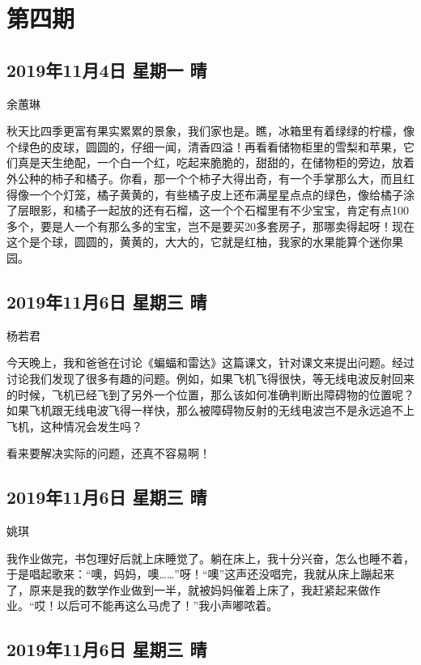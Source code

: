 \chapter{第四期}

\section{2019年11月4日 星期一 晴}

余蕙琳

秋天比四季更富有果实累累的景象，我们家也是。瞧，冰箱里有着绿绿的柠檬，像个绿色的皮球，圆圆的，仔细一闻，清香四溢！再看看储物柜里的雪梨和苹果，它们真是天生绝配，一个白一个红，吃起来脆脆的，甜甜的，在储物柜的旁边，放着外公种的柿子和橘子。你看，那一个个柿子大得出奇，有一个手掌那么大，而且红得像一个个灯笼，橘子黄黄的，有些橘子皮上还布满星星点点的绿色，像给橘子涂了层眼影，和橘子一起放的还有石榴，这一个个石榴里有不少宝宝，肯定有点100多个，要是人一个有那么多的宝宝，岂不是要买20多套房子，那哪卖得起呀！现在这个是个球，圆圆的，黄黄的，大大的，它就是红柚，我家的水果能算个迷你果园。

\section{2019年11月6日 星期三 晴}

杨若君

今天晚上，我和爸爸在讨论《蝙蝠和雷达》这篇课文，针对课文来提出问题。经过讨论我们发现了很多有趣的问题。例如，如果飞机飞得很快，等无线电波反射回来的时候，飞机已经飞到了另外一个位置，那么该如何准确判断出障碍物的位置呢？如果飞机跟无线电波飞得一样快，那么被障碍物反射的无线电波岂不是永远追不上飞机，这种情况会发生吗？

看来要解决实际的问题，还真不容易啊！

\section{2019年11月6日 星期三 晴}

姚琪

我作业做完，书包理好后就上床睡觉了。躺在床上，我十分兴奋，怎么也睡不着，于是唱起歌来：“噢，妈妈，噢……”呀！“噢”这声还没唱完，我就从床上蹦起来了，原来是我的数学作业做到一半，就被妈妈催着上床了，我赶紧起来做作业。“哎！以后可不能再这么马虎了！”我小声嘟哝着。

\section{2019年11月6日 星期三 晴}

